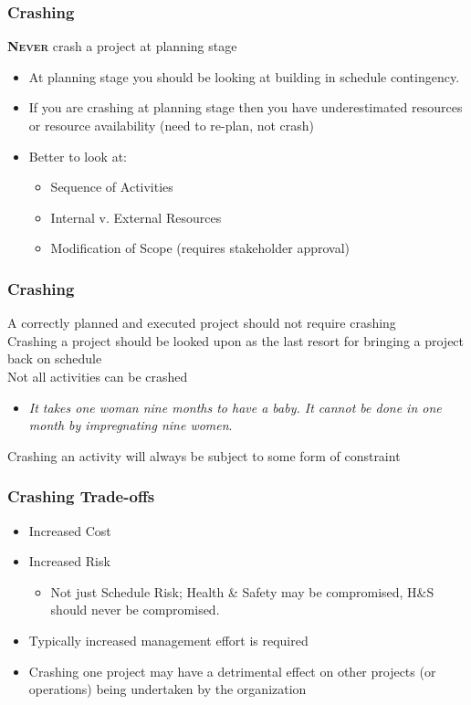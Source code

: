 \begin{frame}
\frametitle{Crashing}
\textsc{\textbf{Never}} crash a project at planning stage
\begin{itemize}
	\item At planning stage you should be looking at building in schedule contingency.
	\item If you are crashing at planning stage then you have underestimated resources or resource availability (need to re-plan, not crash)
	\item Better to look at: 
		\begin{itemize}
			\item Sequence of Activities
			\item Internal v. External Resources
			\item Modification of Scope (requires stakeholder approval)
		\end{itemize}
\end{itemize}
\end{frame}




\begin{frame}
\frametitle{Crashing}
A correctly planned and executed project should not require crashing\\
Crashing a project should be looked upon as the last resort for bringing a project back on schedule\\
Not all activities can be crashed
\begin{itemize}
	\item \textit{It takes one woman nine months to have a baby. It cannot be done in one month by impregnating nine women}. 
\end{itemize}
Crashing an activity will always be subject to some form of constraint
\end{frame}




\begin{frame}
\frametitle{Crashing \hfill Trade-offs}
\begin{itemize}
	\item Increased Cost\\
	\item Increased Risk
		\begin{itemize}
			\item Not just Schedule Risk; Health \& Safety may be compromised, H\&S should never be compromised.
		\end{itemize}
	\item Typically increased management effort is required\\
	\item Crashing one project may have a detrimental effect on other projects (or operations) being undertaken by the organization
\end{itemize}
\end{frame}


